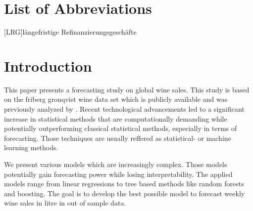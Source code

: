 \documentclass[11pt,]{article}
\begin{document}
\listoftables
{}

\section*{List of Abbreviations}

\begin{adjustwidth}{1.5em}{0pt}

\begin{acronym}[dummyyyy]
 [LRG]{längefristige Refinanzierungsgeschäfte}

\end{acronym}

\end{adjustwidth}

\newpage
{}
\hypertarget{introduction}{%
\section{Introduction}\label{introduction}}

This paper presents a forecasting study on global wine sales. This study
is based on the friberg gronqvist wine data set which is publicly
available and was previously analyzed by
\textcite[][p. 193f.]{Friberg2012}. Recent technological advancements
led to a significant increase in statistical methods that are
computationally demanding while potentially outperforming classical
statistical methods, especially in terms of forecasting. Those
techniques are usually reffered as statistical- or machine learning
methods.

We present various models which are increasingly complex. Those models
potentially gain forecasting power while losing interpretability. The
applied models range from linear regressions to tree based methods like
random forests and boosting. The goal is to develop the best possible
model to forecast weekly wine sales in litre in out of sample data.
\end{document}
